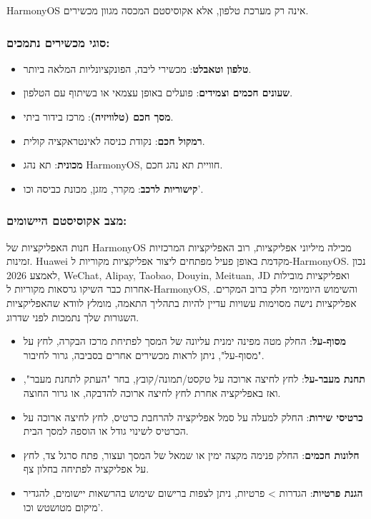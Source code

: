 
HarmonyOS אינה רק מערכת טלפון, אלא אקוסיסטם המכסה מגוון מכשירים.

\subsubsection*{סוגי מכשירים נתמכים:}

\begin{itemize}
  \item \textbf{טלפון וטאבלט}: מכשירי ליבה, הפונקציונליות המלאה ביותר.
  \item \textbf{שעונים חכמים וצמידים}: פועלים באופן עצמאי או בשיתוף עם הטלפון.
  \item \textbf{מסך חכם (טלוויזיה)}: מרכז בידור ביתי.
  \item \textbf{רמקול חכם}: נקודת כניסה לאינטראקציה קולית.
  \item \textbf{מכונית}: תא נהג HarmonyOS, חוויית תא נהג חכם.
  \item \textbf{קישוריות לרכב}: מקרר, מזגן, מכונת כביסה וכו'.
\end{itemize}

\subsubsection*{מצב אקוסיסטם היישומים:}

חנות האפליקציות של HarmonyOS מכילה מיליוני אפליקציות, רוב האפליקציות המרכזיות זמינות. Huawei מקדמת באופן פעיל מפתחים ליצור אפליקציות מקוריות ל-HarmonyOS. נכון לאמצע 2026, WeChat, Alipay, Taobao, Douyin, Meituan, JD ואפליקציות מובילות אחרות כבר השיקו גרסאות מקוריות ל-HarmonyOS, והשימוש היומיומי חלק ברוב המקרים. אפליקציות נישה מסוימות עשויות עדיין להיות בתהליך התאמה, מומלץ לוודא שהאפליקציות השגורות שלך נתמכות לפני שדרוג.


\begin{itemize}
  \item \textbf{מסוף-על}: החלק מטה מפינה ימנית עליונה של המסך לפתיחת מרכז הבקרה, לחץ על "מסוף-על", ניתן לראות מכשירים אחרים בסביבה, גרור לחיבור.
  \item \textbf{תחנת מעבר-על}: לחץ לחיצה ארוכה על טקסט/תמונה/קובץ, בחר "העתק לתחנת מעבר", ואז באפליקציה אחרת לחץ לחיצה ארוכה להדבקה, או גרור החוצה.
  \item \textbf{כרטיסי שירות}: החלק למעלה על סמל אפליקציה להרחבת כרטיס, לחץ לחיצה ארוכה על הכרטיס לשינוי גודל או הוספה למסך הבית.
  \item \textbf{חלונות חכמים}: החלק פנימה מקצה ימין או שמאל של המסך ועצור, פתח סרגל צד, לחץ על אפליקציה לפתיחה בחלון צף.
  \item \textbf{הגנת פרטיות}: הגדרות > פרטיות, ניתן לצפות ברישום שימוש בהרשאות יישומים, להגדיר מיקום מטושטש וכו'.
\end{itemize}

